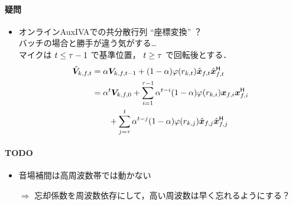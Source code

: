\documentclass[twocolumn,9pt,dvipdfmx]{article}
\begin{document}
\paragraph*{疑問}
\begin{itemize}
  \item オンラインAuxIVAでの共分散行列 ``座標変換'' ？\\ バッチの場合と勝手が違う気がする…\\
    マイクは $t \leq \tau - 1$ で基準位置，
    $t \geq \tau$ で回転後とする．
    \begin{align*}
      \rot{\cov} _{\src,\ft} &= \forget \cov _{\src,\ft[-1]} + (1 - \forget) \weight(\var _{\src,\tframe}) \rot{\Obs} _{\ft} \rot{\Obs} _{\ft} ^{\hermite} \\
                             &= \forget ^{\tframe} \cov _{\src,\freq,0}
                                + \sum _{i = 1} ^{\rotFra - 1} \forget ^{\tframe - i} (1 - \forget) \weight(\var _{\src,i}) \Obs _{\freq,i} \Obs _{\freq,i} ^{\hermite} \\
                             &\qquad + \sum _{j = \rotFra} ^{\tframe} \forget ^{\tframe - j} (1 - \forget) \weight(\var _{\src,j}) \rot{\Obs} _{\freq,j} \rot{\Obs} _{\freq,j} ^{\hermite}
    \end{align*}
\end{itemize}

\paragraph*{TODO}
\begin{itemize}
  \item 音場補間は高周波数帯では動かない
  \item[$\Rightarrow$] 忘却係数を周波数依存にして，高い周波数は早く忘れるようにする？
\end{itemize}
\end{document}
